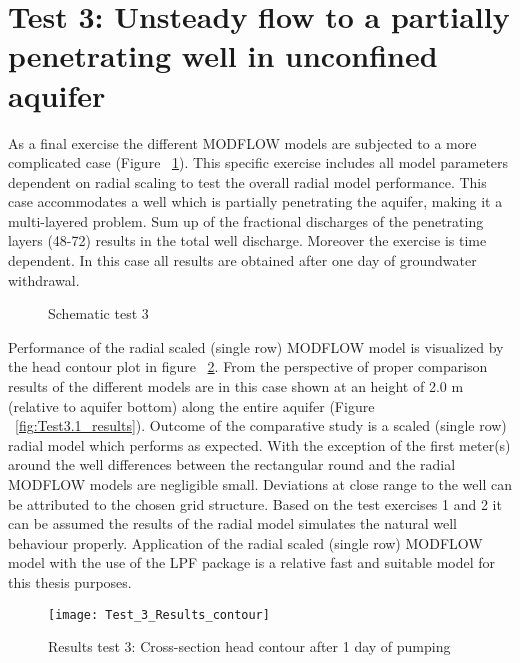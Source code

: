 \clearpage\section{Test 3: Unsteady flow to a partially penetrating well in unconfined aquifer}

As a final exercise the different MODFLOW models are subjected to a more complicated case (Figure ~\ref{fig:Schematictest3}). This specific exercise includes all model parameters dependent on radial scaling to test the overall radial model performance. This case accommodates a well which is partially penetrating the aquifer, making it a multi-layered problem. Sum up of the fractional discharges of the penetrating layers (48-72) results in the total well discharge. Moreover the exercise is time dependent. In this case all results are obtained after one day of groundwater withdrawal. 

\begin{figure}[h]
\centering
{}
\captionsetup{justification=centering}
\caption{Schematic test 3}
\label{fig:Schematictest3}
\end{figure}

Performance of the radial scaled (single row) MODFLOW model is visualized by the head contour plot in figure ~\ref{fig:Test3_results_contour}. From the perspective of proper comparison results of the different models are in this case shown at an height of 2.0 m (relative to aquifer bottom) along the entire aquifer (Figure ~\ref{fig:Test3.1_results}). Outcome of the comparative study is a scaled (single row) radial model which performs as expected. With the exception of the first meter(s) around the well differences between the rectangular round and the radial MODFLOW models are negligible small. Deviations at close range to the well can be attributed to the chosen grid structure. Based on the test exercises 1 and 2 it can be assumed the results of the radial model simulates the natural well behaviour properly. Application of the radial scaled (single row) MODFLOW model with the use of the LPF package is a relative fast and suitable model for this thesis purposes.  

\begin{figure}[h]
 \centering\texttt{[image: Test\_3\_Results\_contour]}
 \captionsetup{justification=centering}
 \caption{Results test 3: Cross-section head contour after 1 day of pumping}
 \label{fig:Test3_results_contour}
\end{figure} 

